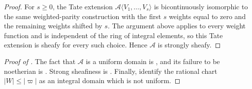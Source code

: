 \documentclass[11pt,reqno]{amsart}
\theoremstyle{definition}
\begin{document}
\begin{proof}
For $s\geq0$, the Tate extension
$\mathcal A\langle V_1,\ldots,V_s\rangle$ is bicontinuously isomorphic to the
same weighted-parity construction with the first $s$ weights equal to zero
and the remaining weights shifted by $s$.  The argument above applies to
every weight function and is independent of the ring of integral elements,
so this Tate extension is sheafy for every such choice.  Hence $\mathcal A$
is strongly sheafy.
\end{proof}

\begin{proof}[Proof of ]
The fact that $\mathcal A$ is a uniform domain is
, and its failure to be noetherian is
.  Strong sheafiness is
.  Finally,
 identify the
rational chart $|W|\leq|\varpi|$ as an integral domain which is not uniform.
\end{proof}
\end{document}
